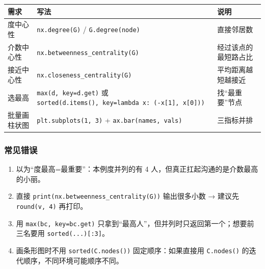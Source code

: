 {\def\LTcaptype{none} %
\begin{longtable}[]{@{}
  >{\raggedright\arraybackslash}p{}
  >{\raggedright\arraybackslash}p{}
  >{\raggedright\arraybackslash}p{}@{}}
\toprule\noalign{}
\begin{minipage}[b]{\linewidth}\raggedright
需求
\end{minipage} & \begin{minipage}[b]{\linewidth}\raggedright
写法
\end{minipage} & \begin{minipage}[b]{\linewidth}\raggedright
说明
\end{minipage} \\
\midrule\noalign{}
\endhead
\bottomrule\noalign{}
\endlastfoot
度中心性 & \texttt{nx.degree(G)} / \texttt{G.degree(node)} &
直接邻居数 \\
介数中心性 & \texttt{nx.betweenness\_centrality(G)} &
经过该点的最短路占比 \\
接近中心性 & \texttt{nx.closeness\_centrality(G)} &
平均距离越短越接近 \\
选最高 & \texttt{max(d,\ key=d.get)} 或
\texttt{sorted(d.items(),\ key=lambda\ x:\ (-x{[}1{]},\ x{[}0{]}))} &
找``最重要''节点 \\
批量画柱状图 & \texttt{plt.subplots(1,\ 3)} +
\texttt{ax.bar(names,\ vals)} & 三指标并排 \\
\end{longtable}
}

\subsubsection{常见错误}\label{ux5e38ux89c1ux9519ux8bef-25}

\begin{enumerate}
\def\labelenumi{\arabic{enumi}.}
\tightlist
\item
  以为``度最高=最重要''：本例度并列的有 4
  人，但真正扛起沟通的是介数最高的小丽。
\item
  直接 \texttt{print(nx.betweenness\_centrality(G))} 输出很多小数 →
  建议先 \texttt{round(v,\ 4)} 再打印。
\item
  用 \texttt{max(bc,\ key=bc.get)}
  只拿到``最高人''，但并列时只返回第一个；想要前三名要用
  \texttt{sorted(...){[}:3{]}}。
\item
  画条形图时不用 \texttt{sorted(C.nodes())} 固定顺序：如果直接用
  \texttt{C.nodes()} 的迭代顺序，不同环境可能顺序不同。
\end{enumerate}

